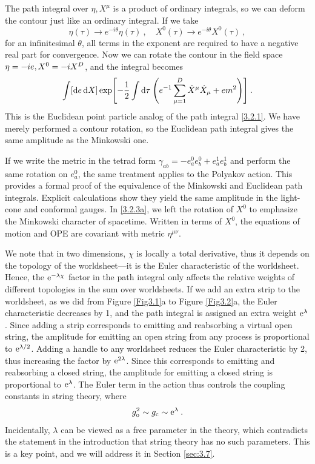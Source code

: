 The path integral over $\eta, X^\mu$ is a product of ordinary integrals, so we can deform the contour just like an ordinary integral. If we take    
\begin{equation}
	\eta(\tau) \rightarrow e^{-i \theta} \eta(\tau)\:, \quad X^{0}(\tau) \rightarrow e^{-i \theta} X^{0}(\tau) \:, \label{3.2.5}
\end{equation}
for an infinitesimal $\theta$, all terms in the exponent are required to have a negative real part for convergence.    
Now we can rotate the contour in the field space $\eta=-i e, X^{0}=-i X^{D}$, and the integral becomes    
\begin{equation}
	\int[\mathrm{d} e \, \mathrm{d} X] \exp \Biggl[-\frac{1}{2} \int \mathrm{d} \tau \: \Biggl(e^{-1} \sum_{\mu=1}^{D} \dot{X}^{\mu} \dot{X}_{\mu}+e m^{2}\Biggr)\Biggr] \:.
	\label{3.2.6}
\end{equation}
This is the Euclidean point particle analog of the path integral \eqref{3.2.1}. We have merely performed a contour rotation, so the Euclidean path integral gives the same amplitude as the Minkowski one.    

If we write the metric in the tetrad form $\gamma_{a b}=-e_{a}^{0} e_{b}^{0}+e_{a}^{1} e_{b}^{1}$ and perform the same rotation on $e_a^0$, the same treatment applies to the Polyakov action. This provides a formal proof of the equivalence of the Minkowski and Euclidean path integrals. Explicit calculations show they yield the same amplitude in the light-cone and conformal gauges. In \eqref{3.2.3a}, we left the rotation of $X^0$ to emphasize the Minkowski character of spacetime. Written in terms of $X^0$, the equations of motion and OPE are covariant with metric $\eta^{\mu\nu}$.    

We note that in two dimensions, $\chi$ is locally a total derivative, thus it depends on the topology of the worldsheet—it is the Euler characteristic of the worldsheet.    
Hence, the $\mathrm{e}^{-\lambda \chi}$ factor in the path integral only affects the relative weights of different topologies in the sum over worldsheets. If we add an extra strip to the worldsheet, as we did from Figure \ref{Fig3.1}a to Figure \ref{Fig3.2}a, the Euler characteristic decreases by 1, and the path integral is assigned an extra weight $\mathrm{e}^\lambda$. Since adding a strip corresponds to emitting and reabsorbing a virtual open string, the amplitude for emitting an open string from any process is proportional to $\mathrm{e}^{\lambda/2}$. Adding a handle to any worldsheet reduces the Euler characteristic by 2, thus increasing the factor by $\mathrm{e}^{2\lambda}$. Since this corresponds to emitting and reabsorbing a closed string, the amplitude for emitting a closed string is proportional to $\mathrm{e}^\lambda$.    
The Euler term in the action thus controls the coupling constants in string theory, where    
\begin{equation}\label{3.2.7}
	g_{\mathrm{o}}^{2} \sim g_{\mathrm{c}} \sim \mathrm{e}^{\lambda} \:.
\end{equation}
Incidentally, $\lambda$ can be viewed as a free parameter in the theory, which contradicts the statement in the introduction that string theory has no such parameters. This is a key point, and we will address it in Section \ref{sec:3.7}.    

